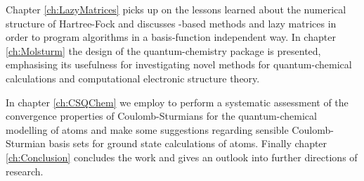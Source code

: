 Chapter \ref{ch:LazyMatrices}
picks up on the lessons learned about the numerical structure
of Hartree-Fock and discusses
\contraction-based methods and lazy matrices
in order to program algorithms
in a basis-function independent way.
In chapter \ref{ch:Molsturm} the design of the quantum-chemistry
package \molsturm is presented,
emphasising its usefulness for investigating novel methods
for quantum-chemical calculations
and computational electronic structure theory.

In chapter \ref{ch:CSQChem} we employ \molsturm
to perform a systematic assessment of
the convergence properties of Coulomb-Sturmians
for the quantum-chemical modelling of atoms
and make some suggestions regarding
sensible Coulomb-Sturmian basis sets for ground state calculations of atoms.
Finally chapter \ref{ch:Conclusion} concludes the work and gives
an outlook into further directions of research.
